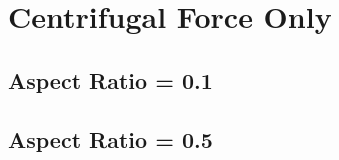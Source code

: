 \section{Centrifugal Force Only}

\subsection{Aspect Ratio = 0.1}

\keradius

\azavgtemperature

\azavgomega
 
\azavgmassflux

\ekfixtable

\clearpage

\subsection{Aspect Ratio = 0.5}
